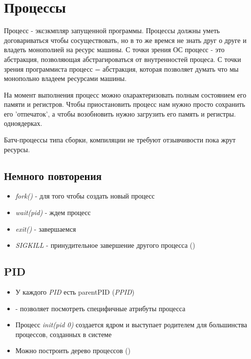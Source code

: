 \documentclass[../lectures.tex]{subfiles}
\begin{document}
\chapter{Процессы}

Процесс - эксзкмпляр запущенной программы. Процессы должны уметь договариваться
чтобы сосуществовать, но в то же времся не знать друг о друге и владеть
монополией на ресурс машины. С точки зрения ОС процесс - это абстракция,
позволяющая абстрагироваться от внутренностей процеса. С точки зрения
программиста процесс = абстракция, которая позволяет думать что мы монопольно
владеем ресурсами машины.

На момент выполнения процесс можно охарактеризовать полным состоянием его памяти
и регистров. Чтобы приостановить процесс нам нужно просто сохранить его
'отпечаток', а чтобы возобновить нужно загрузить его память и регистры.
одноядерках.

Батч-процессы типа сборки, компиляции не требуют отзывчивости пока жрут ресурсы.

\section{Немного повторения}

\begin{itemize}
    \item \emph{fork()} - для того чтобы создать новый процесс
    \item \emph{wait(pid)} - ждем процесс
    \item \emph{exit()} - завершаемся
    \item \emph{SIGKILL} - принудительное завершение другого процесса ()
\end{itemize}

\section{PID}

\begin{itemize}
    \item У каждого \emph{PID} есть parentPID (\emph{PPID})

    \item {} - позволяет посмотреть специфичные атрибуты процесса

    \item Процесс \emph{init(pid 0)} создается ядром и выступает родителем для большинства процессов, созданных в системе

    \item Можно построить дерево процессов ()
\end{itemize}
\end{document}
